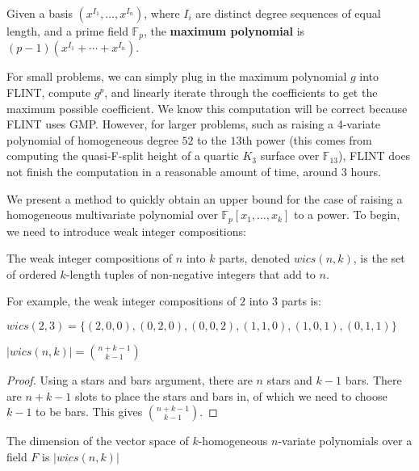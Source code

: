 \begin{defn}
    Given a basis $(x^{I_1}, \dots, x^{I_n})$, where $I_i$ are distinct degree sequences of equal length, and a prime field $\mathbb{F}_p$, the \textbf{maximum polynomial} is $(p - 1)(x^{I_1} + \cdots + x^{I_n})$.
\end{defn}

For small problems, we can simply plug in the maximum polynomial $g$ into FLINT, compute $g ^ p$, and linearly iterate through the coefficients to get the maximum possible coefficient.
We know this computation will be correct because FLINT uses GMP. However, for larger problems, such as raising a 4-variate polynomial of homogeneous degree $52$ to the $13$th power (this comes from computing the quasi-F-split height of a quartic $K_3$ surface over $\mathbb{F}_{13}$), FLINT does not finish the computation in a reasonable amount of time, around 3 hours.

We present a method to quickly obtain an upper bound for the case of raising a homogeneous multivariate polynomial over $\mathbb{F}_p[x_1, \dots , x_k]$ to a power. To begin, we need to introduce weak integer compositions:

\begin{defn}
    The weak integer compositions of $n$ into $k$ parts, denoted $wics(n, k)$, is the set of ordered $k$-length tuples of non-negative integers that add to $n$.
\end{defn}

For example, the weak integer compositions of $2$ into $3$ parts is:
\begin{center}
    $wics(2, 3) = \lbrace (2, 0, 0), (0, 2, 0), (0, 0, 2), (1, 1, 0), (1, 0, 1), (0, 1, 1) \rbrace$
\end{center}

\begin{lem}
    $|wics(n, k)| = \binom{n + k - 1}{k - 1}$
\end{lem}

\begin{proof}
    Using a stars and bars argument, there are $n$ stars and $k - 1$ bars. There are $n + k - 1$ slots to place the stars and bars in, of which we need to choose $k - 1$ to be bars.
    This gives $\binom{n + k - 1}{k - 1}$.
\end{proof}

\begin{rmk}
    The dimension of the vector space of $k$-homogeneous $n$-variate polynomials over a field $F$ is $|wics(n, k)|$
\end{rmk}

